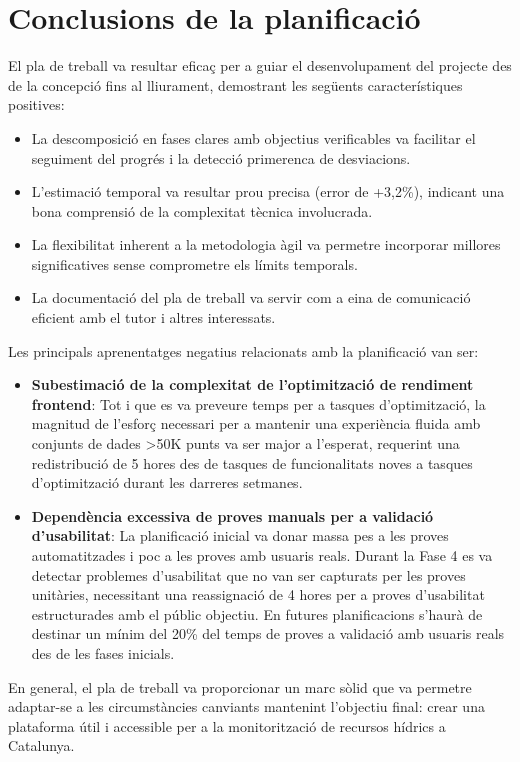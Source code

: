 \section{Conclusions de la planificació}

El pla de treball va resultar eficaç per a guiar el desenvolupament del projecte des de la concepció fins al lliurament, demostrant les següents característiques positives:
\begin{itemize}
    \item La descomposició en fases clares amb objectius verificables va facilitar el seguiment del progrés i la detecció primerenca de desviacions.
    \item L'estimació temporal va resultar prou precisa (error de +3,2\%), indicant una bona comprensió de la complexitat tècnica involucrada.
    \item La flexibilitat inherent a la metodologia àgil va permetre incorporar millores significatives sense comprometre els límits temporals.
    \item La documentació del pla de treball va servir com a eina de comunicació eficient amb el tutor i altres interessats.
\end{itemize}

Les principals aprenentatges negatius relacionats amb la planificació van ser:
\begin{itemize}
    \item \textbf{Subestimació de la complexitat de l'optimització de rendiment frontend}: Tot i que es va preveure temps per a tasques d'optimització, la magnitud de l'esforç necessari per a mantenir una experiència fluida amb conjunts de dades >50K punts va ser major a l'esperat, requerint una redistribució de 5 hores des de tasques de funcionalitats noves a tasques d'optimització durant les darreres setmanes.
    \item \textbf{Dependència excessiva de proves manuals per a validació d'usabilitat}: La planificació inicial va donar massa pes a les proves automatitzades i poc a les proves amb usuaris reals. Durant la Fase 4 es va detectar problemes d'usabilitat que no van ser capturats per les proves unitàries, necessitant una reassignació de 4 hores per a proves d'usabilitat estructurades amb el públic objectiu. En futures planificacions s'haurà de destinar un mínim del 20\% del temps de proves a validació amb usuaris reals des de les fases inicials.
\end{itemize}

En general, el pla de treball va proporcionar un marc sòlid que va permetre adaptar-se a les circumstàncies canviants mantenint l'objectiu final: crear una plataforma útil i accessible per a la monitorització de recursos hídrics a Catalunya.
